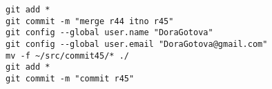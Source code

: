 
\tiny
\begin{verbatim}
git add *
git commit -m "merge r44 itno r45"
git config --global user.name "DoraGotova"
git config --global user.email "DoraGotova@gmail.com"
mv -f ~/src/commit45/* ./
git add *
git commit -m "commit r45"
\end{verbatim}
\normalsize